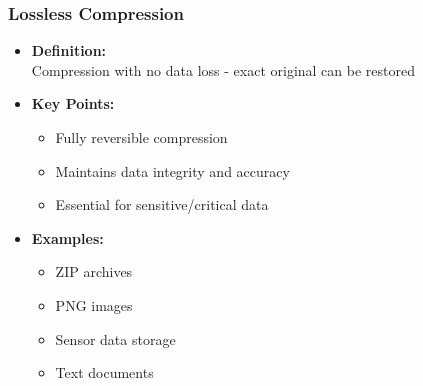 \documentclass[10pt,aspectratio=43]{beamer}
\begin{document}
\begin{frame}
    \frametitle{\textcolor{myMaroon}{Lossless Compression}}
    \begin{itemize}
        \item \textcolor{myMaroon}{\textbf{Definition:}} \\
        Compression with no data loss - exact original can be restored
        
        \vspace{0.4cm}
        \item \textcolor{myMaroon}{\textbf{Key Points:}}
        \begin{itemize}
            \item Fully reversible compression
            \item Maintains data integrity and accuracy
            \item Essential for sensitive/critical data
        \end{itemize}
        
        \vspace{0.4cm}
        \item \textcolor{myMaroon}{\textbf{Examples:}}
        \begin{itemize}
            \item \textcolor{myBlue}{ZIP} archives
            \item \textcolor{myBlue}{PNG} images
            \item \textcolor{myBlue}{Sensor data} storage
            \item \textcolor{myBlue}{Text documents}
        \end{itemize}
    \end{itemize}

\end{frame}
\end{document}
